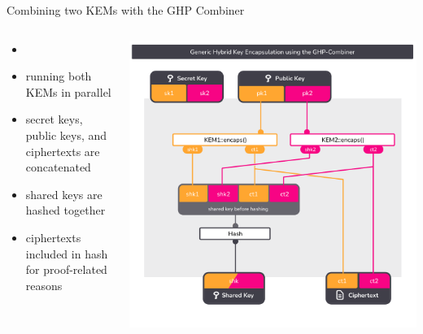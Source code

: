 \begin{frame}{Combining two KEMs with the GHP Combiner}
  \begin{columns}[c]
    \begin{column}{.4\linewidth}
      \small
      \begin{itemize}
        \item {} \citeGhp
        \item running both KEMs in parallel
        \item secret keys, public keys, and ciphertexts are concatenated
        \item shared keys are hashed together
        \item ciphertexts included in hash for proof-related reasons
      \end{itemize}
    \end{column}

    \begin{column}{.6\linewidth}
      \includegraphics[height=.92\textheight,page=1,clip=true,trim={0.5cm 1cm 0.7cm 1.5cm}]{graphics/rosenpass-encapsulation-combiner.pdf}
    \end{column}

  \end{columns}
\end{frame}


